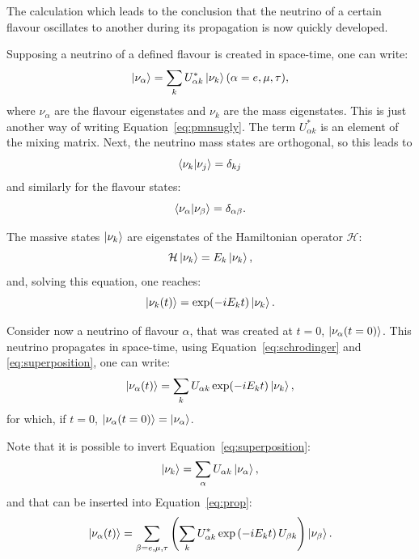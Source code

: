 The calculation which leads to the conclusion that the neutrino of a
certain flavour oscillates to another during its propagation is now
quickly developed.

Supposing a neutrino of a defined flavour is created in space-time,
one can write:
\begin{equation}
  \label{eq:superposition}
  \ket{\nu_\alpha} = \sum_{k}U^{*}_{\alpha k} \ket{\nu_k} (\alpha = e,\mu,\tau),
\end{equation}
where \(\nu_\alpha\) are the flavour eigenstates and \(\nu_k\) are the
mass eigenstates. This is just another way of writing
Equation~\ref{eq:pmnsugly}. The term \(U^{*}_{\alpha k}\) is an
element of the mixing matrix. Next, the neutrino mass states are
orthogonal, so this leads to
\begin{equation}
  \braket{\nu_k|\nu_j}=\delta_{kj}
\end{equation}
and similarly for the flavour states:
\begin{equation}
  \braket{\nu_\alpha|\nu_\beta}=\delta_{\alpha\beta}.
\end{equation}

The massive states $\ket{\nu_k}$ are eigenstates of the Hamiltonian
operator $\mathcal{H}$:
\begin{equation}
  \mathcal{H}\ket{\nu_k}=E_k\ket{\nu_k},
\end{equation}
and, solving this equation, one reaches:
\begin{equation}
  \label{eq:schrodinger}
  \ket{\nu_k(t)} = \exp (-iE_k t)\ket{\nu_k}.
\end{equation}

Consider now a neutrino of flavour $\alpha$, that was created at
$t=0$, $\ket{\nu_\alpha(t=0)}$. This neutrino propagates in
space-time, using Equation~\ref{eq:schrodinger} and
\ref{eq:superposition}, one can write:
\begin{equation}
  \label{eq:prop} \ket{\nu_\alpha(t)} = \sum_k U_{\alpha
    k} \exp (-iE_kt)\ket{\nu_k},
\end{equation} for which, if $t=0$, $\ket{\nu_\alpha(t=0)} =
\ket{\nu_\alpha}$.

Note that it is possible to invert Equation~\ref{eq:superposition}:
\begin{equation}
  \label{eq:superpositioninvert} \ket{\nu_k}=\sum_\alpha U_{\alpha
k}\ket{\nu_\alpha},
\end{equation}
and that can be inserted into Equation~\ref{eq:prop}:
\begin{equation}
\ket{\nu_{\alpha}(t)}=\sum_{\beta=e,\mu,\tau}\left(\sum_{k}U^*_{\alpha
k}\exp\left(-iE_kt\right)U_{\beta k}\right)\ket{\nu_\beta}.
\end{equation}

